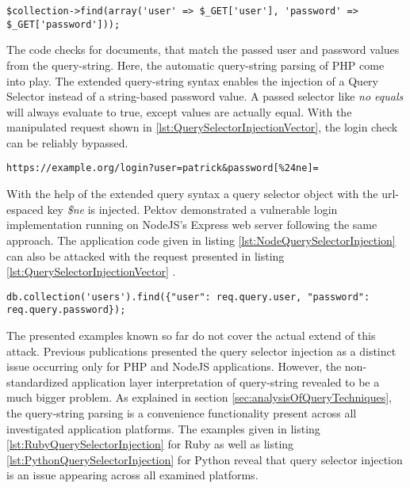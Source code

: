 \begin{lstlisting}[caption={Vulnerable PHP example for query selector injection against MongoDB}, label={lst:PHPQuerySelectorInjection}]
$collection->find(array('user' => $_GET['user'], 'password' => $_GET['password']));
\end{lstlisting}

The code checks for documents, that match the passed user and password values from the query-string. Here, the automatic query-string parsing of PHP come into play. The extended query-string syntax enables the injection of a Query Selector instead of a string-based password value. A passed selector like \emph{no equals} will always evaluate to true, except values are actually equal. With the manipulated request shown in \ref{lst:QuerySelectorInjectionVector}, the login check can be reliably bypassed. \\

\begin{lstlisting}[caption={Attack vector against MongoDB for query selector injection via the query-string parameter}, label={lst:QuerySelectorInjectionVector}]
https://example.org/login?user=patrick&password[%24ne]=
\end{lstlisting}

With the help of the extended query syntax a query selector object with the url-espaced key \emph{\$ne} is injected. Pektov \cite{Petkov:2014a} demonstrated a vulnerable login implementation running on NodeJS's Express web server following the same approach. The application code given in listing \ref{lst:NodeQuerySelectorInjection} can also be attacked with the request presented in listing \ref{lst:QuerySelectorInjectionVector} . \\

\begin{lstlisting}[caption={Vulnerable NodeJS example for query selector injection against MongoDB}, label={lst:NodeQuerySelectorInjection}]
db.collection('users').find({"user": req.query.user, "password": req.query.password});
\end{lstlisting}

The presented examples known so far do not cover the actual extend of this attack. Previous publications presented the query selector injection as a distinct issue occurring only for PHP and NodeJS applications. However, the non-standardized application layer interpretation of query-string revealed to be a much bigger problem. As explained in section \ref{sec:analysisOfQueryTechniques}, the query-string parsing is a convenience functionality present across all investigated application platforms. The examples given in listing \ref{lst:RubyQuerySelectorInjection} for Ruby as well as listing \ref{lst:PythonQuerySelectorInjection} for Python reveal that query selector injection is an issue appearing across all examined platforms. \\


